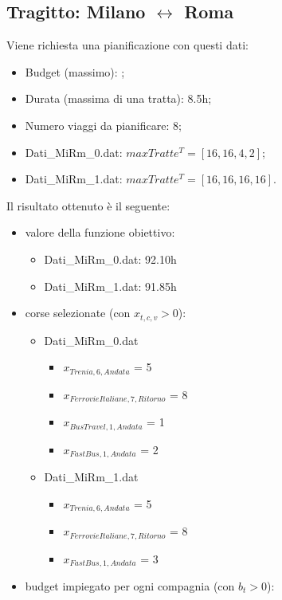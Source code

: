 \documentclass[main.tex]{subfiles}
\begin{document}
\subsection*{Tragitto: Milano $\leftrightarrow$ Roma}
Viene richiesta una pianificazione con questi dati:
\begin{itemize}
    \item Budget (massimo): ;
    \item Durata (massima di una tratta): 8.5h;
    \item Numero viaggi da pianificare: 8;
    \item Dati\_MiRm\_0.dat: $maxTratte^T = [16,16,4,2]$;
    \item Dati\_MiRm\_1.dat: $maxTratte^T = [16,16,16,16]$.
\end{itemize}
Il risultato ottenuto è il seguente:
\begin{itemize}
    \item valore della funzione obiettivo:
    \begin{itemize}
        \item Dati\_MiRm\_0.dat: 92.10h
        \item Dati\_MiRm\_1.dat: 91.85h
    \end{itemize}
    \item corse selezionate (con $x_{t,c,v} > 0$):
    \begin{itemize}
        \item Dati\_MiRm\_0.dat
        \begin{itemize}
            \item $x_{Trenia,6,Andata}$ = 5
            \item $x_{FerrovieItaliane,7,Ritorno}$ = 8
            \item $x_{BusTravel,1,Andata}$ = 1
            \item $x_{FastBus,1,Andata}$ = 2
        \end{itemize}
        \item Dati\_MiRm\_1.dat
        \begin{itemize}
            \item $x_{Trenia,6,Andata}$ = 5
            \item $x_{FerrovieItaliane,7,Ritorno}$ = 8
            \item $x_{FastBus,1,Andata}$ = 3
        \end{itemize}
    \end{itemize}
    \item budget impiegato per ogni compagnia (con $b_t > 0$):
    \begin{itemize}

\end{itemize}
\end{itemize}
\end{document}
